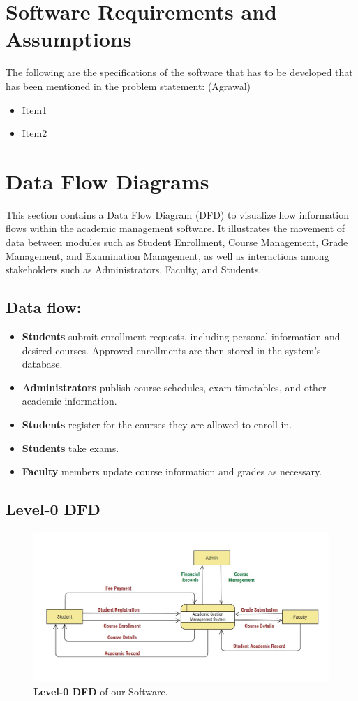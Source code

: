 \documentclass[12pt,a4paper]{article}
\begin{document}
\section{Software Requirements and Assumptions}
The following are the specifications of the software that has to be developed that has been mentioned in the problem statement: (Agrawal)
\begin{itemize}
    \item Item1
    \item Item2
\end{itemize}

\section{Data Flow Diagrams}
This section contains a Data Flow Diagram (DFD) to visualize how information flows within the academic management software. It illustrates the movement of data between modules such as Student Enrollment, Course Management, Grade Management, and Examination Management, as well as interactions among stakeholders such as Administrators, Faculty, and Students.

\subsection*{Data flow:}
\begin{itemize}
    \item \textbf{Students} submit enrollment requests, including personal information and desired courses. Approved enrollments are then stored in the system's database.
    \item \textbf{Administrators} publish course schedules, exam timetables, and other academic information.
    \item \textbf{Students} register for the courses they are allowed to enroll in.
    \item \textbf{Students} take exams.
    \item \textbf{Faculty} members update course information and grades as necessary.
\end{itemize}

\subsection{Level-0 DFD}
\begin{figure}[H]
    \centering
        \includegraphics[scale=0.5]{Level_0_DFD.jpg} 
    \caption{\textbf{Level-0 DFD} of our Software.}
\end{figure}
\end{document}
